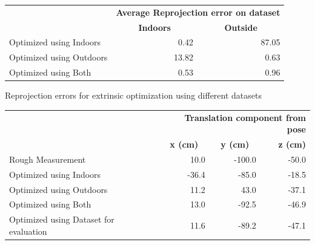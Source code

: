 \begin{table}[H]
   \begin{tabular}{ p{6cm} r r }
    \toprule
    & \multicolumn{2}{r}{\bf{Average Reprojection error on dataset}}  \\
    & \multicolumn{1}{c}{\hspace*{2cm}\bf{Indoors}} & \multicolumn{1}{c}{\hspace*{2cm}\bf{Outside}} \\
    \midrule
    Optimized using Indoors  & 0.42  & 87.05 \\
    Optimized using Outdoors & 13.82 & 0.63 \\
    Optimized using Both     & 0.53  & 0.96 \\ 
    \bottomrule
    \end{tabular}
     {Reprojection errors for extrinsic optimization using different datasets} 
  \label{tab:reprojection_error}
\end{table}


\begin{table}[H]
    \begin{tabular}{ p{6.5cm} r r r} %
    \toprule
    & \multicolumn{3}{r}{\bf{Translation component from pose}}  \\
    & \multicolumn{1}{c}{\hspace*{0.8cm}\bf{x (cm)}} & \multicolumn{1}{c}{\hspace*{0.4cm}\bf{y (cm)}} & \hspace*{0.4cm}\bf{z (cm)} \\
    \midrule
    Rough Measurement & 10.0 & -100.0 & -50.0 \\
    Optimized using Indoors & -36.4 & -85.0 & -18.5\\
    Optimized using Outdoors & 11.2 & 43.0 & -37.1 \\
    Optimized using Both & 13.0 & -92.5 & -46.9 \\ 
    Optimized using Dataset for evaluation & 11.6 & -89.2 & -47.1  \\ 
    \bottomrule
    \end{tabular}
  \label{tab:geometry}
\end{table}

